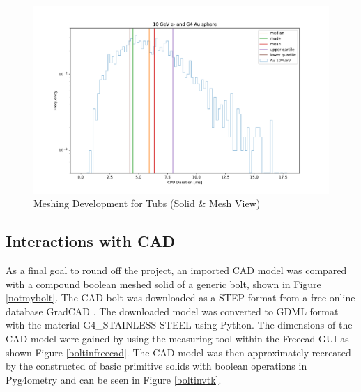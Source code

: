 \documentclass[12pt,a4paper]{article}
\begin{document}
\begin{figure}[h!]
\centering
\includegraphics[scale=0.4]{Images//Materials//Time_ex_dists.pdf}
\caption[width=\columnwidth]{Meshing Development for Tubs (Solid \& Mesh View)}
\label{tubspic}
\end{figure}

%
%

\subsection{Interactions with CAD}
As a final goal to round off the project, an imported CAD model was compared with a compound boolean meshed solid of a generic bolt, shown in Figure \ref{notmybolt}. The CAD bolt was downloaded as a STEP format from a free online database GradCAD \cite{cadmag}. The downloaded model was converted to GDML format with the material G4\_STAINLESS-STEEL using Python. The dimensions of the CAD model were gained by using the measuring tool within the Freecad GUI as shown Figure \ref{boltinfreecad}. The CAD model was then approximately recreated by the constructed of basic primitive solids with boolean operations in Pyg4ometry and can be seen in Figure \ref{boltinvtk}.
\end{document}
